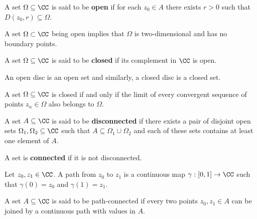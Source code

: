 \documentclass[12pt, a4paper]{article}
\begin{document}
\begin{definition}
    A set \(\Omega \subseteq \CC\) is said to be \textbf{open} if for each \(z_0 \in A\) there exists \(r>0\) such that \(D(z_0,r) \subseteq \Omega\).
\end{definition}

\begin{mdnote}
    A set \(\Omega \subset \CC\) being open implies that \(\Omega\) is two-dimensional and has no boundary points.
\end{mdnote}

\begin{definition}
    A set \(\Omega \subseteq \CC\) is said to be \textbf{closed} if its complement in \(\CC\) is open.
\end{definition}

\begin{mdremark}
    An open disc is an open set and similarly, a closed disc is a closed set.
\end{mdremark}

\begin{theorem}
    A set \(\Omega \subseteq \CC\) is closed if and only if the limit of every convergent sequence of points \(z_n \in \Omega\) also belongs to \(\Omega\).
\end{theorem}

\begin{definition}
    A set \(A \subseteq \CC\) is said to be \textbf{disconnected} if there exists a pair of disjoint open sets \(\Omega_1,\Omega_2 \subseteq \CC\) such that \(A \subseteq \Omega_1 \cup \Omega_2\) and each of these sets contains at least one element of \(A\).
\end{definition}

\begin{definition}
    A set is \textbf{connected} if it is not disconnected.
\end{definition}

\begin{definition}
    Let \(z_0,z_1\in \CC\). A path from \(z_0\) to \(z_1\) is a continuous map \(\gamma : [0,1] \to \CC\) such that \(\gamma(0)=z_0\) and \(\gamma(1)=z_1\).
\end{definition}

\begin{definition}
    A set \(A \subseteq \CC\) is said to be path-connected if every two points \(z_0,z_1 \in A\) can be joined by a continuous path with values in \(A\).
\end{definition}
\end{document}
